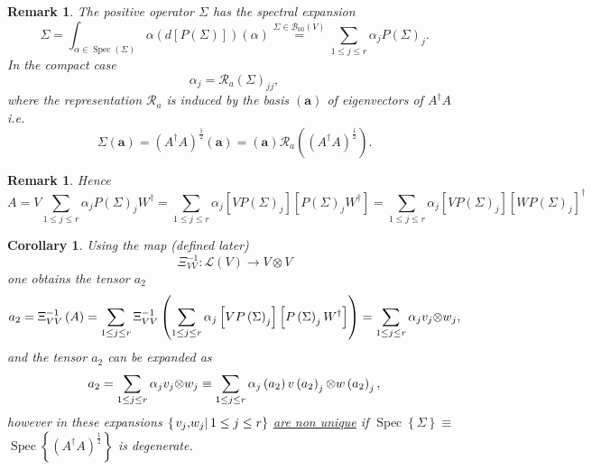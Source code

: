 \documentclass[aps,preprint]{revtex4}%
\newtheorem{corollary}[theorem]{Corollary}
\newtheorem{remark}[theorem]{Remark}
\begin{document}
\begin{remark}
The positive operator $\Sigma$ has the spectral expansion
\begin{equation}
\Sigma=\int_{\alpha\in\operatorname*{Spec}\left(  \Sigma\right)  }%
\alpha\left(  d\left[  P\left(  \Sigma\right)  \right]  \right)  \left(
\alpha\right)  \overset{\Sigma\in\mathcal{B}_{00}\left(  V\right)  }{=}%
\sum_{1\leq j\leq r}\alpha_{j}P\left(  \Sigma\right)  _{j}.
\end{equation}
In the compact case
\begin{equation}
\alpha_{j}=\mathcal{R}_{a}\left(  \Sigma\right)  _{jj},
\end{equation}
where the representation $\mathcal{R}_{a}$ is induced by the basis $\left(
\mathbf{a}\right)  $ of eigenvectors of $A^{\dagger}A$ i.e.
\begin{equation}
\Sigma\left(  \mathbf{a}\right)  =\left(  A^{\dagger}A\right)  ^{\frac{1}{2}%
}\left(  \mathbf{a}\right)  =\left(  \mathbf{a}\right)  \mathcal{R}_{a}\left(
\left(  A^{\dagger}A\right)  ^{\frac{1}{2}}\right)  .
\end{equation}

\end{remark}

\begin{remark}
Hence
\begin{equation}
A=V\sum_{1\leq j\leq r}\alpha_{j}P\left(  \Sigma\right)  _{j}W^{\dagger}%
=\sum_{1\leq j\leq r}\alpha_{j}\left[  VP\left(  \Sigma\right)  _{j}\right]
\left[  P\left(  \Sigma\right)  _{j}W^{\dagger}\right]  =\sum_{1\leq j\leq
r}\alpha_{j}\left[  VP\left(  \Sigma\right)  _{j}\right]  \left[  WP\left(
\Sigma\right)  _{j}\right]  ^{\dagger}%
\end{equation}

\end{remark}

\begin{corollary}
Using the map (defined later)
\begin{equation}
\Xi_{VV}^{-1}:\mathcal{L}\left(  V\right)  \rightarrow V\otimes V
\end{equation}
one obtains the tensor $a_{2}$%
\begin{equation}
a_{2}=\Xi_{VV}^{-1}\left(  A\right)  =\sum_{1\leq j\leq r}\Xi_{VV}^{-1}\left(
\sum_{1\leq j\leq r}\alpha_{j}\left[  VP\left(  \Sigma\right)  _{j}\right]
\left[  P\left(  \Sigma\right)  _{j}W^{\dagger}\right]  \right)  =\sum_{1\leq
j\leq r}\alpha_{j}v_{j}{\small \otimes}w_{j},
\end{equation}
and the tensor $a_{2}$ can be expanded as
\begin{equation}
a_{2}=\sum_{1\leq j\leq r}\alpha_{j}v_{j}{\small \otimes}w_{j}\equiv
\sum_{1\leq j\leq r}\alpha_{j}\left(  a_{2}\right)  v\left(  a_{2}\right)
_{j}{\small \otimes}w\left(  a_{2}\right)  _{j},
\end{equation}
however in these expansions $\left\{  \left.  v_{j}{\small ,}w_{j}\right\vert
1\leq j\leq r\right\}  $ \underline{are non unique} if $\operatorname*{Spec}%
\left\{  \Sigma\right\}  \equiv$ $\operatorname*{Spec}\left\{  \left(
A^{\dagger}A\right)  ^{\frac{1}{2}}\right\}  $ is degenerate.
\end{corollary}
\end{document}
